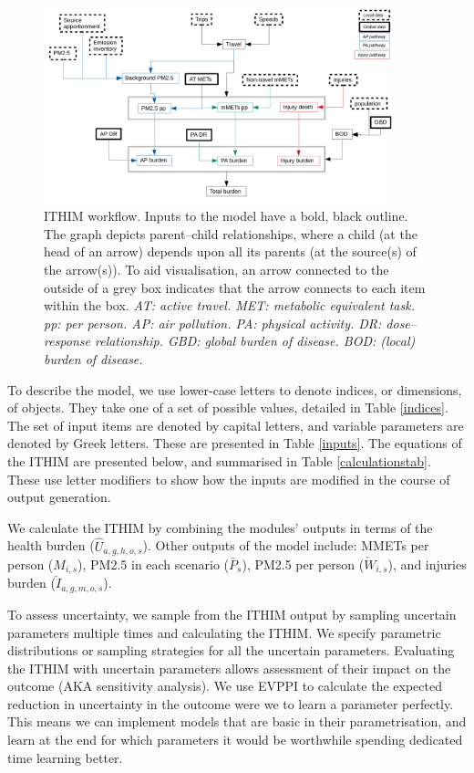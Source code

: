 \documentclass{article}
\begin{document}
\begin{figure}[h]
  \centering
  \includegraphics[width=0.9\textwidth]{flowchart.pdf}
  \caption{\small ITHIM workflow. Inputs to the model have a bold, black outline. The graph depicts parent--child relationships, where a child (at the head of an arrow) depends upon all its parents (at the source(s) of the arrow(s)). To aid visualisation, an arrow connected to the outside of a grey box indicates that the arrow connects to each item within the box. \textit{AT: active travel. MET: metabolic equivalent task. pp: per person. AP: air pollution. PA: physical activity. DR: dose--response relationship. GBD: global burden of disease. BOD: (local) burden of disease.}}
\label{workflow}
\end{figure}

To describe the model, we use lower-case letters to denote indices, or dimensions, of objects. They take one of a set of possible values, detailed in Table \ref{indices}. The set of input items are denoted by capital letters, and variable parameters are denoted by Greek letters. These are presented in Table \ref{inputs}. The equations of the ITHIM are presented below, and summarised in Table \ref{calculationstab}. These use letter modifiers to show how the inputs are modified in the course of output generation. %

We calculate the ITHIM by combining the modules' outputs in terms of the health burden ($\hat{U}_{a,g,h,o,s}$). Other outputs of the model include: MMETs per person ($M_{i,s}$), PM2.5 in each scenario ($\bar{P}_s$), PM2.5 per person ($\check{W}_{i,s}$), and injuries burden ($\check{I}_{a,g,m,o,s}$).

To assess uncertainty, we sample from the ITHIM output by sampling uncertain parameters multiple times and calculating the ITHIM. We specify parametric distributions or sampling strategies for all the uncertain parameters. Evaluating the ITHIM with uncertain parameters allows assessment of their impact on the outcome (AKA sensitivity analysis). We use EVPPI to calculate the expected reduction in uncertainty in the outcome were we to learn a parameter perfectly. This means we can implement models that are basic in their parametrisation, and learn at the end for which parameters it would be worthwhile spending dedicated time learning better. 
\end{document}
